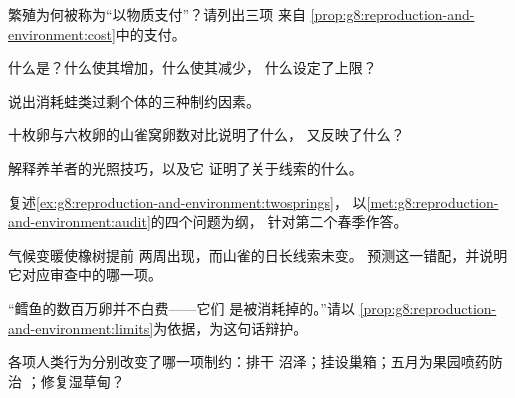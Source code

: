 \begin{exercise}[$\star$]\label{exo:g8:reproduction-and-environment:3}
繁殖为何被称为“以物质支付”？请列出三项
来自
\cref{prop:g8:reproduction-and-environment:cost}中的支付。
\end{exercise}

\begin{exercise}[$\star$]\label{exo:g8:reproduction-and-environment:4}
什么是？什么使其增加，什么使其减少，
什么设定了上限？
\end{exercise}

\begin{exercise}[$\star$]\label{exo:g8:reproduction-and-environment:5}
说出消耗蛙类过剩个体的三种制约因素。
\end{exercise}

\begin{exercise}[$\star$]\label{exo:g8:reproduction-and-environment:6}
十枚卵与六枚卵的山雀窝卵数对比说明了什么，
又反映了什么？
\end{exercise}

\begin{exercise}[$\star\star$]\label{exo:g8:reproduction-and-environment:7}
解释养羊者的光照技巧，以及它
证明了关于线索的什么。
\end{exercise}

\begin{exercise}[$\star\star$]\label{exo:g8:reproduction-and-environment:8}
复述\cref{ex:g8:reproduction-and-environment:twosprings}，
以\cref{met:g8:reproduction-and-environment:audit}的四个问题为纲，
针对第二个春季作答。
\end{exercise}

\begin{exercise}[$\star\star$]\label{exo:g8:reproduction-and-environment:9}
气候变暖使橡树提前
两周出现，而山雀的日长线索未变。
预测这一错配，并说明它对应审查中的哪一项。
\end{exercise}

\begin{exercise}[$\star\star$]\label{exo:g8:reproduction-and-environment:10}
“鳕鱼的数百万卵并不白费——它们
是被消耗掉的。”请以
\cref{prop:g8:reproduction-and-environment:limits}为依据，为这句话辩护。
\end{exercise}

\begin{exercise}[$\star\star$]\label{exo:g8:reproduction-and-environment:11}
各项人类行为分别改变了哪一项制约：排干
沼泽；挂设巢箱；五月为果园喷药防治
；修复湿草甸？
\end{exercise}

